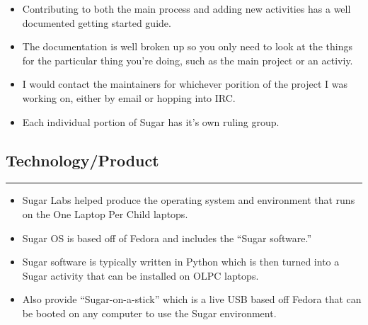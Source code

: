 \begin{itemize}
\itemsep1pt\parskip0pt
\item
  Contributing to both the main process and adding new activities has a
  well documented getting started guide.
\item
  The documentation is well broken up so you only need to look at the
  things for the particular thing you're doing, such as the main project
  or an activiy.
\item
  I would contact the maintainers for whichever porition of the project
  I was working on, either by email or hopping into IRC.
\item
  Each individual portion of Sugar has it's own ruling group.
\end{itemize}

\subsection{Technology/Product}\label{technologyproduct}

\begin{center}\rule{3in}{0.4pt}\end{center}

\begin{itemize}
\itemsep1pt\parskip0pt
\item
  Sugar Labs helped produce the operating system and environment that
  runs on the One Laptop Per Child laptops.
\item
  Sugar OS is based off of Fedora and includes the ``Sugar software.''
\item
  Sugar software is typically written in Python which is then turned
  into a Sugar activity that can be installed on OLPC laptops.
\item
  Also provide ``Sugar-on-a-stick'' which is a live USB based off Fedora
  that can be booted on any computer to use the Sugar environment.
\end{itemize}
